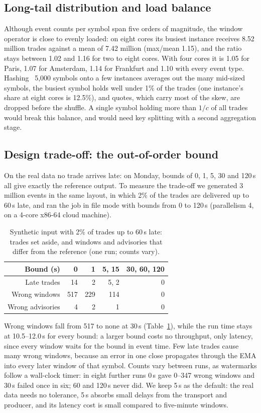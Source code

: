 \documentclass[sigconf]{acmart}
\begin{document}
\subsection{Long-tail distribution and load balance}
Although event counts per symbol span five orders of magnitude, the window operator is close to evenly loaded: on eight cores its busiest instance receives 8.52 million trades against a mean of 7.42 million (max/mean 1.15), and the ratio stays between 1.02 and 1.16 for two to eight cores. With four cores it is 1.05 for Paris, 1.07 for Amsterdam, 1.14 for Frankfurt and 1.10 with every event type. Hashing ~5,000 symbols onto a few instances averages out the many mid-sized symbols, the busiest symbol holds well under 1\% of the trades (one instance's share at eight cores is 12.5\%), and quotes, which carry most of the skew, are dropped before the shuffle. A single symbol holding more than $1/c$ of all trades would break this balance, and would need key splitting with a second aggregation stage.

\subsection{Design trade-off: the out-of-order bound}
On the real data no trade arrives late: on Monday, bounds of 0, 1, 5, 30 and 120\,s all give exactly the reference output. To measure the trade-off we generated 3 million events in the same layout, in which 2\% of the trades are delivered up to 60\,s late, and ran the job in file mode with bounds from 0 to 120\,s (parallelism 4, on a 4-core x86-64 cloud machine).

\begin{table}[t]
  \caption{Synthetic input with 2\% of trades up to 60\,s late: trades set aside, and windows and advisories that differ from the reference (one run; counts vary).}
  \label{tab:ooo}
  \small
  \begin{tabular}{rrrrr}
    \toprule
    Bound (s) & 0 & 1 & 5, 15 & 30, 60, 120\\
    \midrule
    Late trades      & 14  & 2   & 5, 2   & 0\\
    Wrong windows    & 517 & 229 & 114    & 0\\
    Wrong advisories & 4   & 2   & 1      & 0\\
    \bottomrule
  \end{tabular}
\end{table}

Wrong windows fall from 517 to none at 30\,s (Table~\ref{tab:ooo}), while the run time stays at 10.5--12.0\,s for every bound: a larger bound costs no throughput, only latency, since every window waits for the bound in event time. Few late trades cause many wrong windows, because an error in one close propagates through the EMA into every later window of that symbol. Counts vary between runs, as watermarks follow a wall-clock timer: in eight further runs 0\,s gave 0--347 wrong windows and 30\,s failed once in six; 60 and 120\,s never did. We keep 5\,s as the default: the real data needs no tolerance, 5\,s absorbs small delays from the transport and producer, and its latency cost is small compared to five-minute windows.
\end{document}
